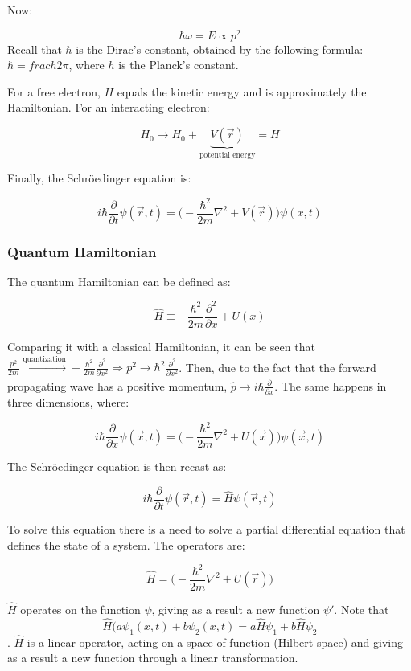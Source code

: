   Now:

  $$\hbar\omega = E \propto p^2$$
  Recall that $\hbar$ is the Dirac's constant, obtained by the following formula: $\hbar=frac{h}{2\pi}$, where $h$ is the Planck's constant.
  
  For a free electron, $H$ equals the kinetic energy and is approximately the Hamiltonian.
  For an interacting electron:

  $$H_0 \rightarrow H_0 + \underbrace{V(\vec{r})}_{\text{potential energy}} = H$$

  Finally, the Schr\"oedinger equation is:

  $$i\hbar \frac{\partial {}}{\partial {t}}\psi(\vec{r},t) = \biggl(-\frac{\hbar^2}{2m}\nabla^2+V(\vec{r})\biggr)\psi(x,t)$$

    \subsubsection{Quantum Hamiltonian}
    The quantum Hamiltonian can be defined as:

    $$\hat{H} \equiv -\frac{\hbar^2}{2m}\frac{\partial^2}{\partial x}+U(x)$$

    Comparing it with a classical Hamiltonian, it can be seen that $\frac{p^2}{2m}\xrightarrow[]{\text{quantization}} - \frac{\hbar^2}{2m}\frac{\partial^2}{\partial x^2}\Rightarrow p^2\rightarrow \hbar^2\frac{\partial^2}{\partial x^2}$.
    Then, due to the fact that the forward propagating wave has a positive momentum, $\hat{p}\rightarrow i\hbar\frac{\partial}{\partial x}$.
    The same happens in three dimensions, where:

    $$i\hbar\frac{\partial }{\partial x}\psi(\vec{x}, t) = \biggl(-\frac{\hbar^2}{2m}\nabla^2+U(\vec{x})\biggr)\psi(\vec{x},t)$$

    The Schr\"oedinger equation is then recast as:

    $$i\hbar \frac{\partial {}}{\partial {t}}\psi(\vec{r},t) = \hat{H} \psi(\vec{r},t)$$

    To solve this equation there is a need to solve a partial differential equation that defines the state of a system.
    The operators are:

    $$\hat{H} = \biggl(-\frac{\hbar^2}{2m}\nabla^2+U(\vec{r})\biggr)$$
    
    $\hat{H}$ operates on the function $\psi$, giving as a result a new function $\psi'$.
    Note that $$\hat{H}(a\psi_1(x,t)+b\psi_2(x,t)=a\hat{H}\psi_1+b\hat{H}\psi_2$$.
    $\hat{H}$ is a linear operator, acting on a space of function (Hilbert space) and giving as a result a new function through a linear transformation. 
    
